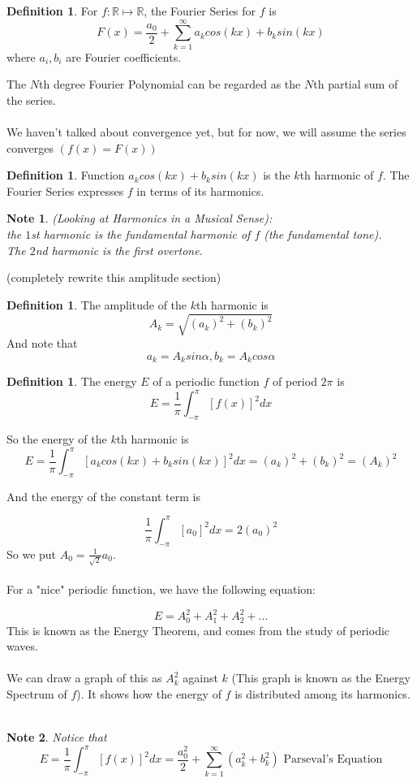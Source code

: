 \documentclass[12pt]{article}
\theoremstyle{plain}
\newtheorem*{note}{Note}
\theoremstyle{definition}
\newtheorem{definition}[theorem]{Definition}
\begin{document}
\begin{definition}
    For $f:\mathbb{R}\mapsto\mathbb{R}$, the Fourier Series for $f$ is
    $$F(x) = \frac{a_0}{2}+ \sum^\infty_{k=1} a_k cos(kx) + b_k sin(kx)$$
    where $a_i, b_i$ are Fourier coefficients.
\end{definition}

The $N$th degree Fourier Polynomial can be regarded as the $N$th partial sum of the series.\\
\\
We haven't talked about convergence yet, but for now, we will assume the series converges $(f(x)=F(x))$

\begin{definition}
    Function $a_k cos(kx) + b_k sin(kx)$ is the $k$th harmonic of $f$. The Fourier Series expresses $f$ in terms of its harmonics.
\end{definition}

\begin{note}
    (Looking at Harmonics in a Musical Sense):\\
    the $1$st harmonic is the fundamental harmonic of $f$ (the fundamental tone).\\
    The $2$nd harmonic is the first overtone.
\end{note}

(completely rewrite this amplitude section)

\begin{definition}
    The amplitude of the $k$th harmonic is 
    $$A_k = \sqrt{(a_k)^2 + (b_k)^2}$$
    And note that
    $$a_k = A_k sin\alpha, b_k = A_k cos\alpha$$
\end{definition}

\begin{definition}
    The energy $E$ of a periodic function $f$ of period $2\pi$ is
    $$E = \frac{1}{\pi} \int^\pi_{-\pi} [f(x)]^2 dx$$
\end{definition}

So the energy of the $k$th harmonic is
$$E = \frac{1}{\pi} \int^\pi_{-\pi} [a_k cos(kx) + b_k sin(kx)]^2 dx = (a_k)^2 + (b_k)^2 = (A_k)^2$$

And the energy of the constant term is

$$\frac{1}{\pi} \int^\pi_{-\pi} [a_0]^2 dx = 2(a_0)^2$$
So we put $A_0 = \frac{1}{\sqrt{2}} a_0$.\\
\\
For a "nice" periodic function, we have the following equation:

$$E = A_0^2 + A_1^2 + A_2^2 + ...$$
This is known as the Energy Theorem, and comes from the study of periodic waves.\\
\\
We can draw a graph of this as $A_k^2$ against $k$ (This graph is known as the Energy Spectrum of $f$). It shows how the energy of $f$ is distributed among its harmonics.\\
\\
\begin{note}
    Notice that
    $$E = \frac{1}{\pi} \int^\pi_{-\pi} [f(x)]^2 dx = \frac{a_0^2}{2}+ \sum^\infty_{k=1} (a_k^2 + b_k^2) \text{ Parseval's Equation}$$
\end{note}
\end{document}
